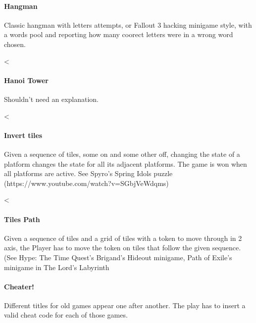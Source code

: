 
\paragraph{Hangman} Classic hangman with letters attempts, or Fallout 3 hacking minigame style, with a words pool and reporting how many coorect letters were in a wrong word chosen.

<\paragraph{Hanoi Tower} Shouldn't need an explanation.

<\paragraph{Invert tiles} Given a sequence of tiles, some on and some other off, changing the state of a platform changes the state for all its adjacent platforms. The game is won when all platforms are active. See Spyro's Spring Idols puzzle (https://www.youtube.com/watch?v=SGbjVeWdqms)


<\paragraph{Tiles Path} Given a sequence of tiles and a grid of tiles with a token to move through in 2 axis, the Player has to move the token on tiles that follow the given sequence. (See Hype: The Time Quest's Brigand's Hideout minigame, Path of Exile's minigame in The Lord's Labyrinth


\paragraph{Cheater!} Different titles for old games appear one after another. The play has to insert a valid cheat code for each of those games.


\pagebreak